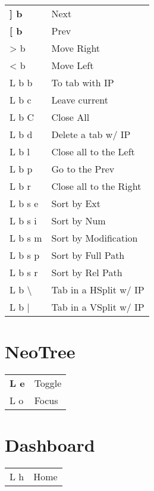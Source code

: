\documentclass[
  ,landscape
  ,columns=4
]{cheatsheet}
\begin{document}
\begin{tabular}{ll}
	\textbf{{]} b}     & Next                   \\
	\textbf{{[} b}     & Prev                   \\
	> b                & Move Right             \\
	< b                & Move Left              \\
	L b b              & To tab with IP         \\
	L b c              & Leave current          \\
	L b C              & Close All              \\
	L b d              & Delete a tab w/ IP     \\
	L b l              & Close all to the Left  \\
	L b p              & Go to the Prev         \\
	L b r              & Close all to the Right \\
	L b s e            & Sort by Ext            \\
	L b s i            & Sort by Num            \\
	L b s m            & Sort by Modification   \\
	L b s p            & Sort by Full Path      \\
	L b s r            & Sort by Rel Path       \\
	L b \textbackslash & Tab in a HSplit w/ IP  \\
	L b {|}            & Tab in a VSplit w/ IP  \\
\end{tabular}

\section{NeoTree}

\begin{tabular}{ll}
	\textbf{L e} & Toggle \\
	L o          & Focus  \\
\end{tabular}

\section{Dashboard}

\begin{tabular}{ll}
	L h & Home \\
\end{tabular}
\end{document}
